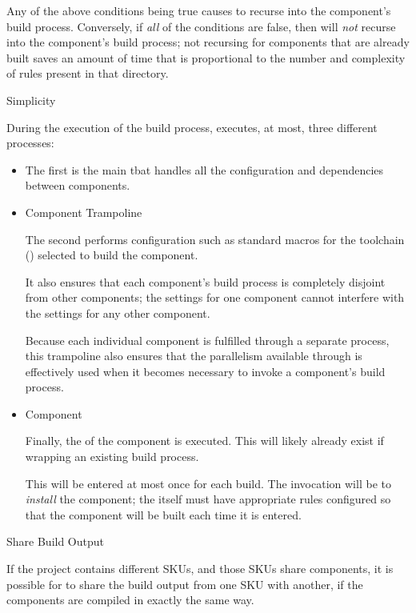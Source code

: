 \begin{description}
  Any of the above conditions being true causes \lmsbw to recurse into
  the component's build process.  Conversely, if \emph{all} of the
  conditions are false, then \lmsbw will \emph{not} recurse into the
  component's build process; not recursing for components that are
  already built saves an amount of time that is proportional to the
  number and complexity of \make rules present in that directory.

\item{\makefile Simplicity}

  During the execution of the build process, \lmsbw executes, at most,
  three different \makefile processes:

  \begin{itemize}
  \item{\lmsbw \makefile}

    The first is the main \lmsbw \makefile tbat handles all the
    configuration and dependencies between components.

  \item{Component Trampoline \makefile}

    The second \makefile performs configuration such as standard
    macros for the toolchain ()
    selected to build the component.

    It also ensures that each component's build process is completely
    disjoint from other components; the settings for one component
    cannot interfere with the settings for any other component.

    Because each individual component is fulfilled through a separate
    \make process, this trampoline also ensures that the parallelism
    available through \gnumake is effectively used when it becomes
    necessary to invoke a component's build process.

  \item{Component \makefile}

    Finally, the \makefile of the component is executed.  This will
    likely already exist if wrapping an existing build process.

    This \makefile will be entered at most once for each build.  The
    invocation will be to \emph{install} the component; the \makefile
    itself must have appropriate rules configured so that the
    component will be built each time it is entered.
\end{itemize}

\item{Share Build Output}

  If the project contains different SKUs, and those SKUs share
  components, it is possible for \lmsbw to share the build output from
  one SKU with another, if the components are compiled in exactly the
  same way.

\end{description}

